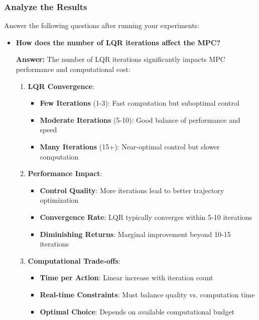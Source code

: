 \subsubsection{Analyze the Results} 
Answer the following questions after running your experiments: 
\begin{itemize} 
    \item \textbf{How does the number of LQR iterations affect the MPC?}
    
    \textbf{Answer:} The number of LQR iterations significantly impacts MPC performance and computational cost:
    
    \begin{enumerate}
        \item \textbf{LQR Convergence}:
        \begin{itemize}
            \item \textbf{Few Iterations} (1-3): Fast computation but suboptimal control
            \item \textbf{Moderate Iterations} (5-10): Good balance of performance and speed
            \item \textbf{Many Iterations} (15+): Near-optimal control but slower computation
        \end{itemize}
        
        \item \textbf{Performance Impact}:
        \begin{itemize}
            \item \textbf{Control Quality}: More iterations lead to better trajectory optimization
            \item \textbf{Convergence Rate}: LQR typically converges within 5-10 iterations
            \item \textbf{Diminishing Returns}: Marginal improvement beyond 10-15 iterations
        \end{itemize}
        
        \item \textbf{Computational Trade-offs}:
        \begin{itemize}
            \item \textbf{Time per Action}: Linear increase with iteration count
            \item \textbf{Real-time Constraints}: Must balance quality vs. computation time
            \item \textbf{Optimal Choice}: Depends on available computational budget
        \end{itemize}
        

\end{enumerate}
\end{itemize}
